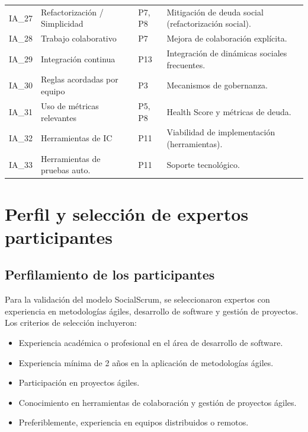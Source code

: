 \begin{longtable}[H]{
    >{\raggedright\arraybackslash}p{1.2cm}
    >{\raggedright\arraybackslash}p{6.5cm}
    >{\centering\arraybackslash}p{1.5cm}
    >{\raggedright\arraybackslash}p{3.8cm}
    }
    IA\_27       & Refactorización / Simplicidad            & P7, P8            & Mitigación de deuda social (refactorización social).                         \\
    IA\_28       & Trabajo colaborativo                     & P7                & Mejora de colaboración explícita.                                            \\
    IA\_29       & Integración continua                     & P13               & Integración de dinámicas sociales frecuentes.                                \\
    IA\_30       & Reglas acordadas por equipo              & P3                & Mecanismos de gobernanza.                                                    \\
    IA\_31       & Uso de métricas relevantes               & P5, P8            & Health Score y métricas de deuda.                                            \\
    IA\_32       & Herramientas de IC                       & P11               & Viabilidad de implementación (herramientas).                                 \\
    IA\_33       & Herramientas de pruebas auto.            & P11               & Soporte tecnológico.                                                         \\
\end{longtable}
\endgroup

\section{Perfil y selección de expertos participantes}
\label{sec:perfil-seleccion-expertos}

\subsection{Perfilamiento de los participantes}
Para la validación del modelo SocialScrum, se seleccionaron expertos con experiencia en metodologías ágiles, desarrollo de software y gestión de proyectos. Los criterios de selección incluyeron:
\begin{itemize}
    \item Experiencia académica o profesional en el área de desarrollo de software.
    \item Experiencia mínima de 2 años en la aplicación de metodologías ágiles.
    \item Participación en proyectos ágiles.
    \item Conocimiento en herramientas de colaboración y gestión de proyectos ágiles.
    \item Preferiblemente, experiencia en equipos distribuidos o remotos.
\end{itemize}

